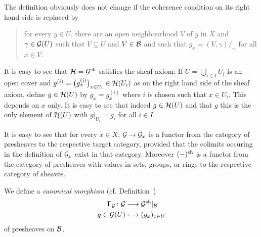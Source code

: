\documentclass[a4paper,parskip=half,numbers=enddot, DIV=12]{scrreprt}
\begin{document}
\begin{rem*}    
    \begin{alphanumerate}
      \item 
        The definition  obviously does not change if the coherence condition on its right hand side is replaced by 
        \begin{quote}
            for every $y\in U$, there are an open neighbourhood $V$ of $y$ in $X$ and $\gamma\in \mathcal{G}(U)$ such that $V\subseteq U$ and $V\in\mathcal{B}$ and such that $g_x =(V,\gamma)/_\sim$ for all $x\in V$.
        \end{quote}
      \item 
        It is easy to see that $\mathcal{H}=\mathcal{G}^{\mathrm{sh}}$ satisfies the sheaf axiom: If $U = \bigcup_{i\in I} U_i$ is an open cover and $g^{(i)} = \big(g^{(i)}_x\big)_{x\in U_i}\in \mathcal{H}(U_i)$ as on the right hand side of the sheaf axiom, define $g\in \mathcal{H}(U)$ by $g_x = g_x^{(i)}$ where $i$ is chosen such that $x\in U_i$. This depends on $x$ only. It is easy to see that indeed $g\in \mathcal{H}(U)$ and that $g$ this is the only element of $\mathcal{H}(U)$ with $g|_{U_i} = g_i$ for all $i\in I$.
      \item
        It is easy to see that for every $x\in X$, $\mathcal{G}\to \mathcal{G}_x$ is a functor from the category of presheaves to the respective target category, provided that the colimits occuring in the definition of $\mathcal{G}_x$ exist in that category. Moreover $(-)^{\mathrm{sh}}$ is a functor from the category of presheaves with values in sets, groups, or rings to the respective category of sheaves.
    \end{alphanumerate}
\end{rem*}
We define a \emph{canonical morphism} (cf. Definition~)
\begin{align*}
    \Gamma_\Gg\colon\Gg&\morphism \Gg^\sh|_\Bb\\
    g\in \Gg(U) &\longmapsto (g_x)_{x\in U}
\end{align*}
of presheaves on $\mathcal{B}$.
\end{document}
